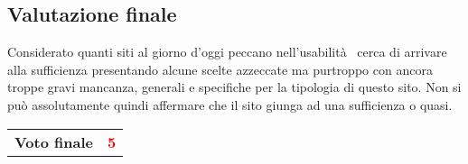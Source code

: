 \documentclass[../Relazione.tex]{subfiles}
\begin{document}
\newpage
	\subsection{Valutazione finale} 
		Considerato quanti siti al giorno d'oggi peccano nell'usabilità \paint\ cerca di arrivare alla sufficienza presentando alcune scelte azzeccate ma purtroppo con ancora troppe gravi mancanza, generali e specifiche per la tipologia di questo sito. Non si può assolutamente quindi affermare che il sito giunga ad una sufficienza o quasi.\vspace{0,7cm}
		
		\begin{center}
		\begin{tabular}{c|r}
			\Large\textbf{Voto finale} & \Large\textbf{\textcolor{red}{5}} \\
		\end{tabular}
		\end{center}
\end{document}
